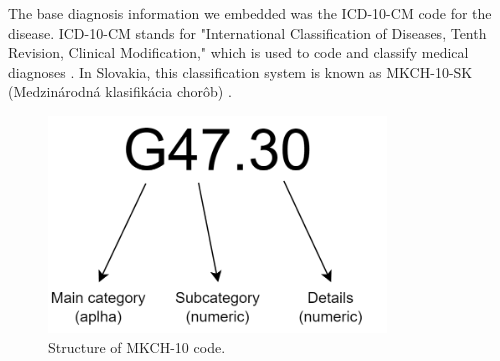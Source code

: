 The base diagnosis information we embedded was the ICD-10-CM code for the disease. ICD-10-CM stands for "International Classification of Diseases, Tenth Revision, Clinical Modification," which is used to code and classify medical diagnoses \cite{cdcICD10CM}. In Slovakia, this classification system is known as MKCH-10-SK (Medzinárodná klasifikácia chorôb) \cite{ncziMKCH}.
\\

\begin{figure}[!h]
	\centering
	
	\includegraphics[width=0.8\textwidth]{images/ICD-10-CM.png}
	
	\caption{Structure of MKCH-10 code.}
	\label{fig:icd-10-cm}
\end{figure}

